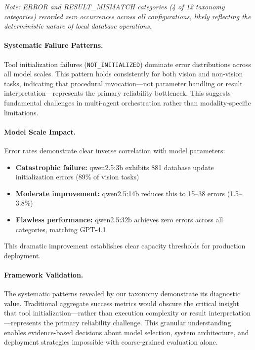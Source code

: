 \textit{Note: ERROR and RESULT\_MISMATCH categories (4 of 12 taxonomy categories) recorded zero occurrences across all configurations, likely reflecting the deterministic nature of local database operations.}

\paragraph{Systematic Failure Patterns.} Tool initialization failures (\texttt{NOT\_INITIALIZED}) dominate error distributions across all model scales. This pattern holds consistently for both vision and non-vision tasks, indicating that procedural invocation---not parameter handling or result interpretation---represents the primary reliability bottleneck. This suggests fundamental challenges in multi-agent orchestration rather than modality-specific limitations.

\paragraph{Model Scale Impact.} Error rates demonstrate clear inverse correlation with model parameters:

\begin{itemize}[leftmargin=*]
    \item \textbf{Catastrophic failure:} qwen2.5:3b exhibits 881 database update initialization errors (89\% of vision tasks)
    \item \textbf{Moderate improvement:} qwen2.5:14b reduces this to 15--38 errors (1.5--3.8\%)
    \item \textbf{Flawless performance:} qwen2.5:32b achieves zero errors across all categories, matching GPT-4.1
\end{itemize}

This dramatic improvement establishes clear capacity thresholds for production deployment.

\paragraph{Framework Validation.} The systematic patterns revealed by our taxonomy demonstrate its diagnostic value. Traditional aggregate success metrics would obscure the critical insight that tool initialization---rather than execution complexity or result interpretation---represents the primary reliability challenge. This granular understanding enables evidence-based decisions about model selection, system architecture, and deployment strategies impossible with coarse-grained evaluation alone.

